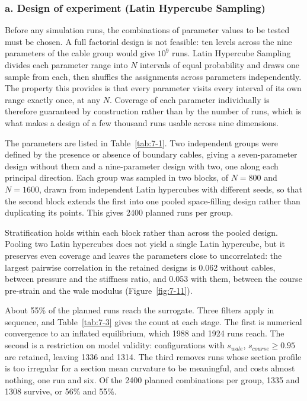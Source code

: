 \subsubsection{a. Design of experiment (Latin Hypercube Sampling)}\label{sec:7.2.2.1}

Before any simulation runs, the combinations of parameter values to be tested must
be chosen. A full factorial design is not feasible: ten levels across the nine
parameters of the cable group would give \(10^{9}\) runs. Latin Hypercube Sampling
\cite{mckay1992latin} divides each parameter range into \(N\) intervals of equal
probability and draws one sample from each, then shuffles the assignments across
parameters independently. The property this provides is that every parameter
visits every interval of its own range exactly once, at any \(N\). Coverage of
each parameter individually is therefore guaranteed by construction rather than by
the number of runs, which is what makes a design of a few thousand runs usable
across nine dimensions.

The parameters are listed in Table~\ref{tab:7-1}. Two independent groups were
defined by the presence or absence of boundary cables, giving a seven-parameter
design without them and a nine-parameter design with two, one along each
principal direction. Each group was sampled in two blocks, of \(N = 800\) and
\(N = 1600\), drawn from independent Latin hypercubes with different seeds, so
that the second block extends the first into one pooled space-filling design
rather than duplicating its points. This gives 2400 planned runs per group.

Stratification holds within each block rather than across the pooled design.
Pooling two Latin hypercubes does not yield a single Latin hypercube, but it
preserves even coverage and leaves the parameters close to uncorrelated: the
largest pairwise correlation in the retained designs is 0.062 without cables,
between pressure and the stiffness ratio, and 0.053 with them, between the course
pre-strain and the wale modulus (Figure~\ref{fig:7-11}).

About 55\% of the planned runs reach the surrogate. Three filters apply in
sequence, and Table~\ref{tab:7-3} gives the count at each stage. The first is
numerical convergence to an inflated equilibrium, which 1988 and 1924 runs reach.
The second is a restriction on model validity: configurations with
\(s_{wale}\), \(s_{course} \geq 0.95\) are retained, leaving 1336 and 1314. The
third removes runs whose section profile is too irregular for a section mean
curvature to be meaningful, and costs almost nothing, one run and six. Of the
2400 planned combinations per group, 1335 and 1308 survive, or 56\% and 55\%.

